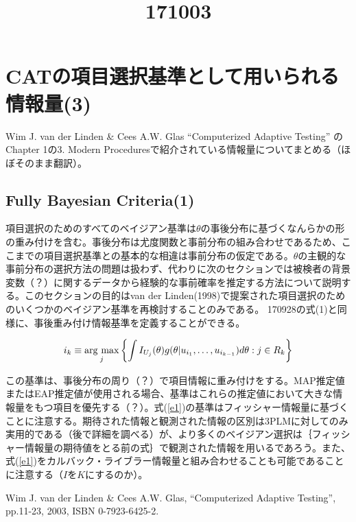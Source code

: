 \documentclass[a4j]{jarticle}
\date{}
\title{171003}
\begin{document}
\maketitle

\section{CATの項目選択基準として用いられる情報量(3)}
Wim J. van der Linden \& Cees A.W. Glas ``Computerized Adaptive Testing'' \cite{b1}のChapter 1の3. Modern Proceduresで紹介されている情報量についてまとめる（ほぼそのまま翻訳）。

\subsection{Fully Bayesian Criteria(1)}
項目選択のためのすべてのベイジアン基準は$\theta$の事後分布に基づくなんらかの形の重み付けを含む。事後分布は尤度関数と事前分布の組み合わせであるため、ここまでの項目選択基準との基本的な相違は事前分布の仮定である。$\theta$の主観的な事前分布の選択方法の問題は扱わず、代わりに次のセクションでは被検者の背景変数（？）に関するデータから経験的な事前確率を推定する方法について説明する。このセクションの目的はvan der Linden(1998)で提案された項目選択のためのいくつかのベイジアン基準を再検討することのみである。
170928の式(1)と同様に、事後重み付け情報基準を定義することができる。

\newcommand{\argmax}{\mathop{\rm arg~max}\limits}
\begin{eqnarray}
  \label{e1}
  i_{k} \equiv \argmax_{j}\left\{\int I_{U_{j}}(\theta)g(\theta|u_{i_{1}},\ldots,u_{i_{k-1}})d\theta:j\in R_{k}\right\}
\end{eqnarray}

この基準は、事後分布の周り（？）で項目情報に重み付けをする。MAP推定値またはEAP推定値が使用される場合、基準はこれらの推定値において大きな情報量をもつ項目を優先する（？）。式(\ref{e1})の基準はフィッシャー情報量に基づくことに注意する。期待された情報と観測された情報の区別は3PLMに対してのみ実用的である（後で詳細を調べる）が、より多くのベイジアン選択は｛フィッシャー情報量の期待値をとる前の式｝で観測された情報を用いるであろう。また、式(\ref{e1})をカルバック・ライブラー情報量と組み合わせることも可能であることに注意する（$I$を$K$にするのか）。

\begin{thebibliography}{9}
   Wim J. van der Linden \& Cees A.W. Glas, ``Computerized Adaptive Testing'', pp.11-23, 2003, ISBN 0-7923-6425-2.
\end{thebibliography}
\end{document}
